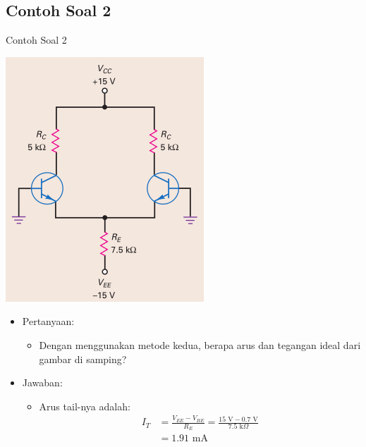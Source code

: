 \documentclass[aspectratio=169]{beamer}
\begin{document}
\subsection{Contoh Soal 2}
\begin{frame}{Contoh Soal 2}
	\begin{multicols}{2}
		\begin{center}
			\includegraphics[width=0.6\textheight]{gambar/01.latihan_soal_1a}
		\end{center}
		\columnbreak
		\begin{itemize}
			\item Pertanyaan:
			\begin{itemize}
				\item Dengan menggunakan metode kedua, berapa arus dan tegangan ideal dari gambar di samping?
			\end{itemize}
			\item Jawaban:
			\begin{itemize}
				\item Arus tail-nya adalah:
				\begin{align*}
					I_T &= \frac{V_{EE}-V_{BE}}{R_E} = \frac{15 \text{ V} - 0.7 \text{ V}}{7.5 \text{ k}\Omega} \\
					&= 1.91 \text{ mA}
				\end{align*}
			\end{itemize}
		\end{itemize}
		\vfill\null
	\end{multicols}
\end{frame}
\end{document}
